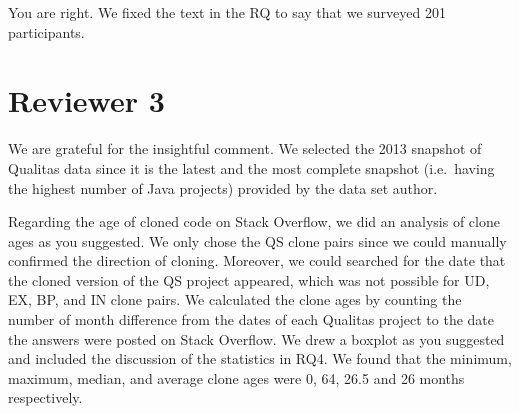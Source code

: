 \documentclass[a4paper,twoside,10pt]{reviewresponse}
\begin{document}
You are right. We fixed the text in the RQ to say that we surveyed 201 participants.

\section{Reviewer 3}


We are grateful for the insightful comment. We selected the 2013 snapshot of Qualitas data since it is the latest and the most complete snapshot (i.e.~having the highest number of Java projects) provided by the data set author. 

Regarding the age of cloned code on Stack Overflow, we did an analysis of clone ages as you suggested. We only chose the QS clone pairs since we could manually confirmed the direction of cloning. Moreover, we could searched for the date that the cloned version of the QS project appeared, which was not possible for UD, EX, BP, and IN clone pairs. 
We calculated the clone ages by counting the number of month difference from the dates of each Qualitas project to the date the answers were posted on Stack Overflow.
We drew a boxplot as you suggested and included the discussion of the statistics in RQ4. We found that the minimum, maximum, median, and average clone ages were 0, 64, 26.5 and 26 months respectively.  %

\end{document}

